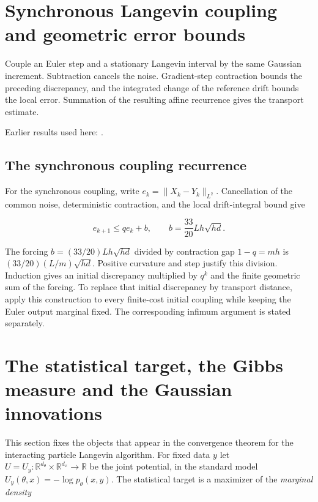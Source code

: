 \documentclass[11pt,a4paper]{report}
\begin{document}
\section{\texorpdfstring{Synchronous Langevin coupling and geometric error bounds}{Synchronous Langevin coupling and geometric error bounds}}
\label{proof-module-IPLA-Dalalyan-lean}


Couple an Euler step and a stationary Langevin interval by the same Gaussian increment. Subtraction cancels the noise. Gradient-step contraction bounds the preceding discrepancy, and the integrated change of the reference drift bounds the local error. Summation of the resulting affine recurrence gives the transport estimate.




Earlier results used here: \cite[Section~3.19]{LangevinLean2026ULASC}.
\subsection{\texorpdfstring{The synchronous coupling recurrence}{The synchronous coupling recurrence}}
\label{report-step-IPLA-Dalalyan-lean-1}


For the synchronous coupling, write \(e_k=\|X_k-Y_k\|_{L^2}\). Cancellation of the common noise, deterministic contraction, and the local drift-integral bound give

\[e_{k+1}\le q e_k+b,\qquad b=\frac{33}{20}Lh\sqrt{hd}.\]

The forcing \(b=(33/20)Lh\sqrt{hd}\) divided by contraction gap \(1-q=mh\) is \((33/20)(L/m)\sqrt{hd}\). Positive curvature and step justify this division. Induction gives an initial discrepancy multiplied by \(q^k\) and the finite geometric sum of the forcing. To replace that initial discrepancy by transport distance, apply this construction to every finite-cost initial coupling while keeping the Euler output marginal fixed. The corresponding infimum argument is stated separately.



\section{\texorpdfstring{The statistical target, the Gibbs measure and the Gaussian innovations}{The statistical target, the Gibbs measure and the Gaussian innovations}}
\label{proof-module-IPLA-Model-lean}


This section fixes the objects that appear in the convergence theorem for the interacting particle Langevin algorithm. For fixed data \(y\) let \(U=U_y:\mathbb R^{d_\theta}\times\mathbb R^{d_x}\to\mathbb R\) be the joint potential, in the standard model \(U_y(\theta,x)=-\log p_\theta(x,y)\). The statistical target is a maximizer of the \emph{marginal density}
\end{document}
